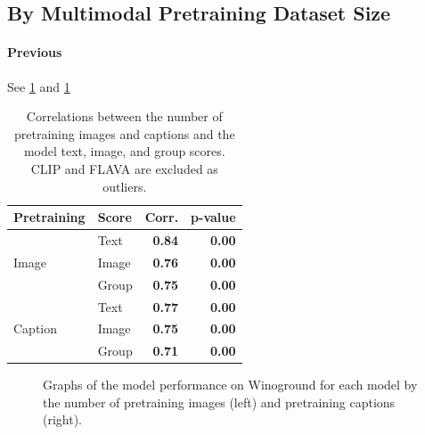 \subsection{By Multimodal Pretraining Dataset Size}

\paragraph{Previous}

See \cref{tab:data-size-correlations-baseline} and \cref{fig:pretraining_images_baseline}

\begin{table}[ht]
\centering
\begin{tabular}{llrr}
\toprule
Pretraining & Score & Corr. & p-value\\\midrule
 & Text & \textbf{0.84} & \textbf{0.00} \\
 Image & Image & \textbf{0.76} & \textbf{0.00} \\
 & Group & \textbf{0.75} & \textbf{0.00} \\\midrule
 & Text  & \textbf{0.77} & \textbf{0.00} \\
 Caption & Image & \textbf{0.75} & \textbf{0.00} \\
 & Group & \textbf{0.71} & \textbf{0.00} \\
\bottomrule
\end{tabular}
\caption{Correlations between the number of pretraining images and captions and the model text, image, and group scores. CLIP and FLAVA are excluded as outliers.}
\label{tab:data-size-correlations-baseline}
\end{table}

\begin{figure}[ht]
    \centering
    \caption{Graphs of the model performance on Winoground for each model by the number of pretraining images (left) and pretraining captions (right).}
    \label{fig:pretraining_images_baseline}
\end{figure}

